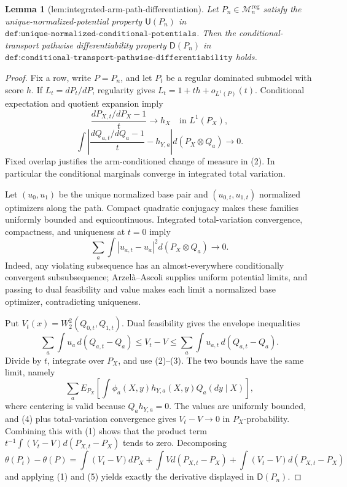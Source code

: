 \documentclass{article}
\newtheorem{lemma}{Lemma}
\begin{document}
\begin{lemma}[lem:integrated-arm-path-differentiation]\label{lem:integrated-arm-path-differentiation}
Let \(P_n\in\mathcal M_n^{\mathrm{reg}}\) satisfy the unique-normalized-potential property \(\mathsf U(P_n)\) in \(\texttt{def:unique-normalized-conditional-potentials}\). Then the conditional-transport pathwise differentiability property \(\mathsf D(P_n)\) in \(\texttt{def:conditional-transport-pathwise-differentiability}\) holds.
\end{lemma}
\begin{proof}
Fix a row, write \(P=P_n\), and let \(P_t\) be a regular dominated submodel with score \(h\). If \(L_t=dP_t/dP\), regularity gives \(L_t=1+th+o_{L^1(P)}(t)\). Conditional expectation and quotient expansion imply
\[\frac{dP_{X,t}/dP_X-1}{t}\to h_X\quad\text{in }L^1(P_X),\tag{1}\]
\[\int\!\left|\frac{dQ_{a,t}/dQ_a-1}{t}-h_{Y,a}\right|d(P_X\otimes Q_a)\to0.\tag{2}\]
Fixed overlap justifies the arm-conditioned change of measure in (2). In particular the conditional marginals converge in integrated total variation.

Let \((u_0,u_1)\) be the unique normalized base pair and \((u_{0,t},u_{1,t})\) normalized optimizers along the path. Compact quadratic conjugacy makes these families uniformly bounded and equicontinuous. Integrated total-variation convergence, compactness, and uniqueness at \(t=0\) imply
\[\sum_a\int|u_{a,t}-u_a|^2d(P_X\otimes Q_a)\to0.\tag{3}\]
Indeed, any violating subsequence has an almost-everywhere conditionally convergent subsubsequence; Arzel\`a--Ascoli supplies uniform potential limits, and passing to dual feasibility and value makes each limit a normalized base optimizer, contradicting uniqueness.

Put \(V_t(x)=W_2^2(Q_{0,t},Q_{1,t})\). Dual feasibility gives the envelope inequalities
\[\sum_a\int u_a\,d(Q_{a,t}-Q_a)\le V_t-V\le\sum_a\int u_{a,t}\,d(Q_{a,t}-Q_a).\tag{4}\]
Divide by \(t\), integrate over \(P_X\), and use (2)--(3). The two bounds have the same limit, namely
\[\sum_aE_{P_X}\!\left[\int\phi_a(X,y)h_{Y,a}(X,y)Q_a(dy\mid X)\right],\tag{5}\]
where centering is valid because \(Q_ah_{Y,a}=0\). The values are uniformly bounded, and (4) plus total-variation convergence gives \(V_t-V\to0\) in \(P_X\)-probability. Combining this with (1) shows that the product term \(t^{-1}\int(V_t-V)d(P_{X,t}-P_X)\) tends to zero. Decomposing
\[\theta(P_t)-\theta(P)=\int(V_t-V)dP_X+\int Vd(P_{X,t}-P_X)+\int(V_t-V)d(P_{X,t}-P_X)\]
and applying (1) and (5) yields exactly the derivative displayed in \(\mathsf D(P_n)\).
\end{proof}
\end{document}
